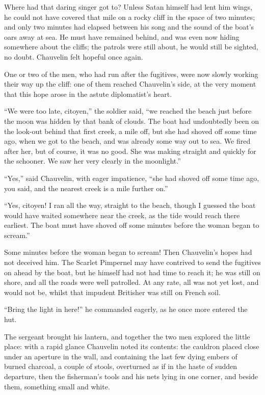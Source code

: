 \documentclass[paper=5.5in:8.5in,BCOR=7mm,twoside,DIV=calc,12pt,usegeometry,chapterprefix,endperiod,headings=big]{scrbook}
\begin{document}
Where had that daring singer got to? Unless Satan himself had lent him wings, he could not have covered that mile on a rocky cliff in the space of two minutes; and only two minutes had elapsed between his song and the sound of the boat's oars away at sea. He must have remained behind, and was even now hiding somewhere about the cliffs; the patrols were still about, he would still be sighted, no doubt. Chauvelin felt hopeful once again.

One or two of the men, who had run after the fugitives, were now slowly working their way up the cliff: one of them reached Chauvelin's side, at the very moment that this hope arose in the astute diplomatist's heart.

\enquote{We were too late, citoyen,} the soldier said, \enquote{we reached the beach just before the moon was hidden by that bank of clouds. The boat had undoubtedly been on the look-out behind that first creek, a mile off, but she had shoved off some time ago, when we got to the beach, and was already some way out to sea. We fired after her, but of course, it was no good. She was making straight and quickly for the schooner. We saw her very clearly in the moonlight.}

\enquote{Yes,} said Chauvelin, with eager impatience, \enquote{she had shoved off some time ago, you said, and the nearest creek is a mile further on.}

\enquote{Yes, citoyen! I ran all the way, straight to the beach, though I guessed the boat would have waited somewhere near the creek, as the tide would reach there earliest. The boat must have shoved off some minutes before the woman began to scream.}

Some minutes before the woman began to scream! Then Chauvelin's hopes had not deceived him. The Scarlet Pimpernel may have contrived to send the fugitives on ahead by the boat, but he himself had not had time to reach it; he was still on shore, and all the roads were well patrolled. At any rate, all was not yet lost, and would not be, whilst that impudent Britisher was still on French soil.

\enquote{Bring the light in here!} he commanded eagerly, as he once more entered the hut.

The sergeant brought his lantern, and together the two men explored the little place: with a rapid glance Chauvelin noted its contents: the cauldron placed close under an aperture in the wall, and containing the last few dying embers of burned charcoal, a couple of stools, overturned as if in the haste of sudden departure, then the fisherman's tools and his nets lying in one corner, and beside them, something small and white.
\end{document}
